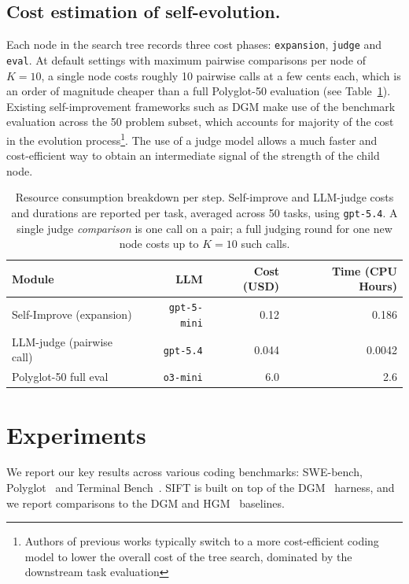 \documentclass{article}
\begin{document}
\subsection{Cost estimation of self-evolution.}
Each node in the search tree records three cost phases: \texttt{expansion}, \texttt{judge} and \texttt{eval}. At default settings with maximum pairwise comparisons per node of $K=10$, a single node costs roughly 10 pairwise calls at a few cents each, which is an order of magnitude cheaper than a full Polyglot-50 evaluation (see Table~\ref{tab:cost_analysis}). Existing self-improvement frameworks such as DGM make use of the benchmark evaluation across the 50 problem subset, which accounts for majority of the cost in the evolution process\footnote{Authors of previous works typically switch to a more cost-efficient coding model to lower the overall cost of the tree search, dominated by the downstream task evaluation}. The use of a judge model allows a much faster and cost-efficient way to obtain an intermediate signal of the strength of the child node.

\begin{table}[ht]
\centering
\caption{Resource consumption breakdown per step. Self-improve and LLM-judge costs and durations are reported per task, averaged across 50 tasks, using \texttt{gpt-5.4}. A single judge \emph{comparison} is one call on a pair; a full judging round for one new node costs up to $K=10$ such calls.}
\begin{tabular}{lrrr}
\toprule
\textbf{Module} &  \textbf{LLM} & \textbf{Cost (USD)} & \textbf{Time (CPU Hours)} \\
\midrule
Self-Improve (expansion) & \texttt{gpt-5-mini}      & 0.12   & 0.186  \\
LLM-judge (pairwise call)  & \texttt{gpt-5.4}   & 0.044  & 0.0042 \\
Polyglot-50 full eval   & \texttt{o3-mini}        & 6.0    & 2.6    \\
\bottomrule
\end{tabular}
\label{tab:cost_analysis}
\end{table}

\vspace{-4mm}
\section{Experiments}
We report our key results across various coding benchmarks: SWE-bench\citep{jimenez2024swebench}, Polyglot~\citep{polyglot} and Terminal Bench~\citep{merrill2026terminalbenchbenchmarkingagentshard}. SIFT is built on top of the DGM~\citep{dgm} harness, and we report comparisons to the DGM and HGM~\citep{hgm} baselines.
\vspace{-4mm}
\end{document}
